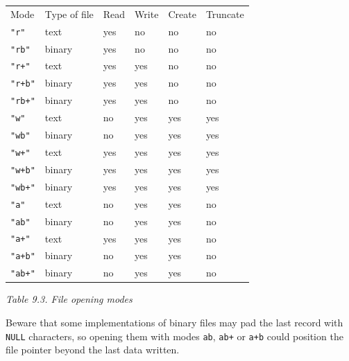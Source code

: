    \begin{tabular}{lllllp{\textwidth}}
     Mode & Type of file & Read & Write & Create & Truncate
    \\

     \texttt{"r"} & text & yes & no & no & no
    \\

     \texttt{"rb"} & binary & yes & no & no & no
    \\

     \texttt{"r+"} & text & yes & yes & no & no
    \\

     \texttt{"r+b"} & binary & yes & yes & no & no
    \\

     \texttt{"rb+"} & binary & yes & yes & no & no
    \\

     \texttt{"w"} & text & no & yes & yes & yes
    \\

     \texttt{"wb"} & binary & no & yes & yes & yes
    \\

     \texttt{"w+"} & text & yes & yes & yes & yes
    \\

     \texttt{"w+b"} & binary & yes & yes & yes & yes
    \\

     \texttt{"wb+"} & binary & yes & yes & yes & yes
    \\

     \texttt{"a"} & text & no & yes & yes & no
    \\

     \texttt{"ab"} & binary & no & yes & yes & no
    \\

     \texttt{"a+"} & text & yes & yes & yes & no
    \\

     \texttt{"a+b"} & binary & no & yes & yes & no
    \\

     \texttt{"ab+"} & binary & no & yes & yes & no
    \\
\end{tabular}

\begin{center}\textit{Table 9.3. File opening modes}\end{center}


   Beware that some implementations of binary files may pad the last record
    with \texttt{NULL} characters, so opening them with modes
    \texttt{ab}, \texttt{ab+} or \texttt{a+b} could position the
    file  pointer  beyond  the last data written.


